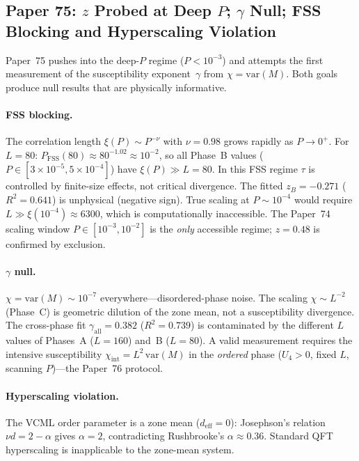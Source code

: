 \documentclass[11pt]{article}
\begin{document}
\subsection*{Paper 75: $z$ Probed at Deep $P$; $\gamma$ Null; FSS Blocking and Hyperscaling
Violation}

Paper~75 pushes into the deep-$P$ regime ($P<10^{-3}$) and attempts the first measurement
of the susceptibility exponent~$\gamma$ from $\chi=\mathrm{var}(M)$.
Both goals produce null results that are physically informative.

\paragraph{FSS blocking.}
The correlation length $\xi(P)\sim P^{-\nu}$ with $\nu=0.98$ grows rapidly as $P\to0^+$.
For $L=80$: $P_\mathrm{FSS}(80)\approx80^{-1.02}\approx10^{-2}$, so all Phase~B values
($P\in[3\times10^{-5},5\times10^{-4}]$) have $\xi(P)\gg L=80$.  In this FSS regime $\tau$
is controlled by finite-size effects, not critical divergence.  The fitted $z_B=-0.271$
($R^2=0.641$) is unphysical (negative sign).
True scaling at $P\sim10^{-4}$ would require $L\gg\xi(10^{-4})\approx6300$, which is
computationally inaccessible.  The Paper~74 scaling window $P\in[10^{-3},10^{-2}]$ is the
\emph{only} accessible regime; $z=0.48$ is confirmed by exclusion.

\paragraph{$\gamma$ null.}
$\chi=\mathrm{var}(M)\sim10^{-7}$ everywhere---disordered-phase noise.
The scaling $\chi\sim L^{-2}$ (Phase~C) is geometric dilution of the zone mean, not a
susceptibility divergence.  The cross-phase fit $\gamma_\mathrm{all}=0.382$ ($R^2=0.739$)
is contaminated by the different $L$ values of Phases~A ($L=160$) and~B ($L=80$).
A valid measurement requires the intensive susceptibility
$\chi_\mathrm{int}=L^2\,\mathrm{var}(M)$ in the \emph{ordered} phase ($U_4>0$, fixed $L$,
scanning $P$)---the Paper~76 protocol.

\paragraph{Hyperscaling violation.}
The VCML order parameter is a zone mean ($d_\mathrm{eff}=0$): Josephson's relation
$\nu d=2-\alpha$ gives $\alpha=2$, contradicting Rushbrooke's $\alpha\approx0.36$.
Standard QFT hyperscaling is inapplicable to the zone-mean system.
\end{document}
